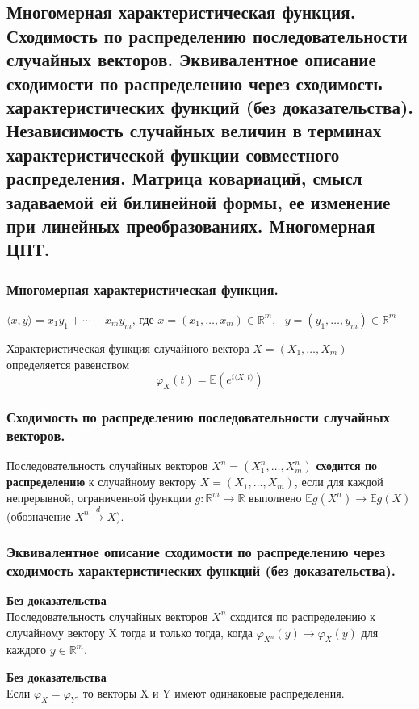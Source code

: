	\subsection{Многомерная характеристическая функция. Сходимость по распределению последовательности случайных векторов. Эквивалентное описание сходимости по распределению через сходимость характеристических функций (без доказательства). Независимость случайных величин в терминах характеристической функции совместного распределения. Матрица ковариаций, смысл задаваемой ей билинейной формы, ее изменение при линейных преобразованиях. Многомерная ЦПТ.}
	\subsubsection{Многомерная характеристическая функция.}
	\begin{designation}
		$\langle x, y \rangle = x_1y_1 + \cdots + x_my_m$, где $ x = (x_1, \ldots , x_m)\in \mathbb{R}^m,\text{ } y = (y_1, \ldots , y_m)\in \mathbb{R}^m$
	\end{designation}
	\begin{definition}
		Характеристическая функция случайного вектора $ X = (X_1, \ldots , X_m)\ $ определяется равенством
		$$\varphi_{X}(t) = \mathbb{E}(e^{i\langle X, t \rangle})$$
	\end{definition}
	\subsubsection{Сходимость по распределению последовательности случайных векторов.}
	\begin{definition}
		Последовательность случайных векторов $ X^n = (X^n_1, \ldots, X^n_m) $ \textbf{сходится по распределению} к случайному вектору $ X = (X_1,\ldots, X_m) $, если для каждой непрерывной, ограниченной функции $ g : \mathbb{R}^m\to \mathbb{R} $ выполнено $ \mathbb{E}g(X^n)\to \mathbb{E}g(X) $ (обозначение $ X^n \xrightarrow{d} X $).
	\end{definition}
	\subsubsection{Эквивалентное описание сходимости по распределению через сходимость характеристических функций (без доказательства).}
	\begin{theorem}
		\textbf{Без доказательства}\\
		Последовательность случайных векторов $ X^n $ сходится по распределению к случайному вектору X тогда и только тогда, когда $ \varphi_{X^n}(y)\to\varphi_X(y) $ для каждого $ y \in \mathbb{R}^m $.
	\end{theorem}
	\begin{corollary}
		\textbf{Без доказательства}\\
		Если $ \varphi_X = \varphi_Y $, то векторы X и Y имеют одинаковые распределения.
	\end{corollary}
